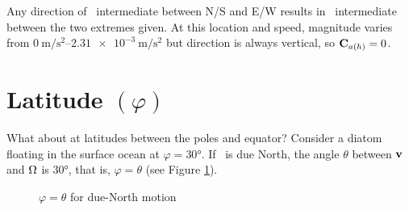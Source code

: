 Any direction of \vV\ intermediate between N/S and E/W results in \vCa\ intermediate between the two extremes given. At this location and speed, magnitude varies from $\qtyrange{0}{2.31e-3}{\meter\per\second\squared}$ but direction is always vertical, so $\textbf{C$_{a(h)}$}=0$.

\section{Latitude $(\varphi)$}

What about at latitudes between the poles and equator? Consider a diatom floating in the surface ocean at $\varphi=\ang{30}$. If \vVn\ is due North, the angle $\theta$ between $\textbf{v}$ and $\Omega$ is \ang{30}, that is, $\varphi=\theta$ (see Figure \ref{Vn}).
\begin{figure}
\begin{center}
\caption{$\varphi=\theta$ for due-North motion}
\label{Vn}
\end{center}
\end{figure}

